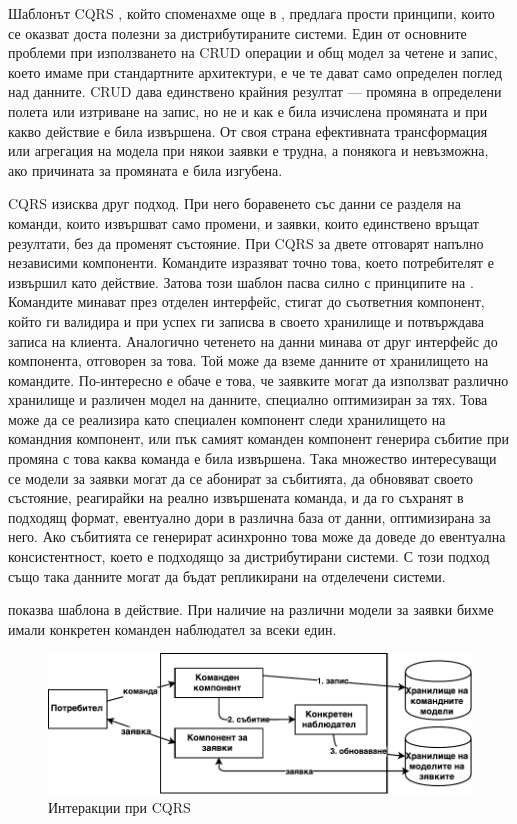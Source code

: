 Шаблонът CQRS \cite{young2010CQRS}, който споменахме още в , предлага прости принципи, които се оказват доста полезни за дистрибутираните системи. Един от основните проблеми при използването на CRUD операции и общ модел за четене и запис, което имаме при стандартните архитектури, е че те дават само определен поглед над данните. CRUD дава единствено крайния резултат — промяна в определени полета или изтриване на запис, но не и как е била изчислена промяната и при какво действие е била извършена. От своя страна ефективната трансформация или агрегация на модела при някои заявки е трудна, а понякога и невъзможна, ако причината за промяната е била изгубена.

CQRS изисква друг подход. При него боравенето със данни се разделя на команди, които извършват само промени, и заявки, които единствено връщат резултати, без да променят състояние. При CQRS за двете отговарят напълно независими компоненти. Командите изразяват точно това, което потребителят е извършил като действие. Затова този шаблон пасва силно с принципите на  \cite{evans2003DDD}. Командите минават през отделен интерфейс, стигат до съответния компонент, който ги валидира и при успех ги записва в своето хранилище и потвърждава записа на клиента. Аналогично четенето на данни минава от друг интерфейс до компонента, отговорен за това. Той може да вземе данните от хранилището на командите. По-интересно е обаче е това, че заявките могат да използват различно хранилище и различен модел на данните, специално оптимизиран за тях. Това може да се реализира като специален компонент следи хранилището на командния компонент, или пък самият команден компонент генерира събитие при промяна с това каква команда е била извършена. Така множество интересуващи се модели за заявки могат да се абонират за събитията, да обновяват своето състояние, реагирайки на реално извършената команда, и да го съхранят в подходящ формат, евентуално дори в различна база от данни, оптимизирана за него. Ако събитията се генерират асинхронно това може да доведе до евентуална консистентност, което е подходящо за дистрибутирани системи. С този подход също така данните могат да бъдат репликирани на отделечени системи.

 показва шаблона в действие. При наличие на различни модели за заявки бихме имали конкретен команден наблюдател за всеки един.

\begin{figure}
  \includegraphics[width=\textwidth]{images/cqrs.pdf}
  \caption{Интеракции при CQRS}
  \label{fig:cqrs-in-action}
\end{figure}

